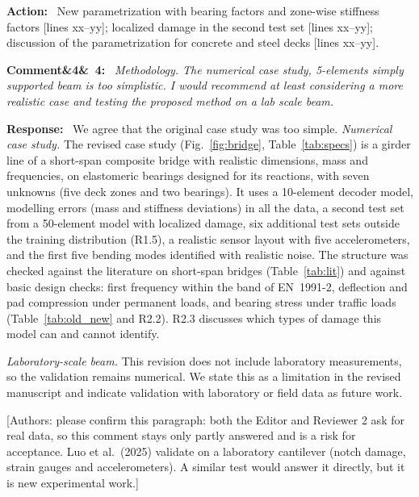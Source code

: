 \documentclass[11pt]{article}
\newenvironment{rcomment}[1]{\par\bigskip\noindent\textbf{Comment\ifx&#1&\else\ #1\fi:}\ \itshape}{\par}
\newenvironment{response}{\par\smallskip\noindent\color{resp}\textbf{Response:}\ }{\par}
\newenvironment{action}{\par\smallskip\noindent\color{resp}\textbf{Action:}\ }{\par}
\newcommand{\authornote}[1]{\textcolor{note}{\textsf{[Authors: #1]}}}
\newcommand{\tbd}[1]{\textcolor{note}{\textsf{[#1]}}}
\newcommand{\lines}[1]{\tbd{lines #1}}
\begin{document}
\begin{action}
New parametrization with bearing factors and zone-wise stiffness factors \lines{xx--yy}; localized damage in the
second test set \lines{xx--yy}; discussion of the parametrization for concrete and steel decks \lines{xx--yy}.
\end{action}

\begin{rcomment}{4}
Methodology. The numerical case study, 5-elements simply supported beam is too simplistic. I would recommend at least
considering a more realistic case and testing the proposed method on a lab scale beam.
\end{rcomment}

\begin{response}
We agree that the original case study was too simple. \textit{Numerical case study.} The revised case study (Fig.~\ref{fig:bridge},
Table~\ref{tab:specs}) is a girder line of a short-span composite bridge with realistic dimensions, mass and
frequencies, on elastomeric bearings designed for its reactions, with seven unknowns (five deck zones and two bearings).
It uses a 10-element decoder model, modelling errors (mass and stiffness deviations) in all the data, a second test set
from a 50-element model with localized damage, six additional test sets outside the training distribution (R1.5), a
realistic sensor layout with five accelerometers, and the first five bending modes identified with realistic noise.
The structure was checked against the literature on short-span bridges (Table~\ref{tab:lit}) and against basic design
checks: first frequency within the band of EN~1991-2, deflection and pad compression under permanent loads, and bearing
stress under traffic loads
(Table~\ref{tab:old_new} and R2.2). R2.3 discusses which types of damage this model can and cannot identify.

\textit{Laboratory-scale beam.} This revision does not include laboratory measurements, so the validation remains numerical.
We state this as a limitation in the revised manuscript and indicate validation with laboratory or field data as future
work.
\end{response}
\authornote{please confirm this paragraph: both the Editor and Reviewer 2 ask for real data, so this comment stays only partly
answered and is a risk for acceptance. Luo et al.\ (2025) validate on a laboratory cantilever (notch damage, strain gauges and
accelerometers). A similar test would answer it directly, but it is new experimental work.}
\end{document}
